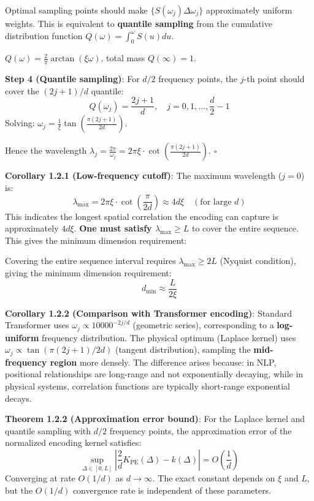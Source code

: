 \documentclass[
  12pt,
]{article}
\begin{document}
Optimal sampling points should make $\{S(\omega_j)\Delta\omega_j\}$ approximately uniform weights. This is equivalent to \textbf{quantile sampling} from the cumulative distribution function $Q(\omega) = \int_0^{\omega} S(u)du$.

$Q(\omega) = \frac{2}{\pi} \arctan(\xi\omega)$, total mass $Q(\infty) = 1$.

\textbf{Step 4 (Quantile sampling)}: For $d/2$ frequency points, the $j$-th point should cover the $(2j+1)/d$ quantile:
\[Q(\omega_j) = \frac{2j+1}{d}, \quad j = 0, 1, \ldots, \frac{d}{2}-1\]
Solving: $\omega_j = \frac{1}{\xi} \tan\left(\frac{\pi(2j+1)}{2d}\right)$.

Hence the wavelength $\lambda_j = \frac{2\pi}{\omega_j} = 2\pi\xi \cdot \cot\left(\frac{\pi(2j+1)}{2d}\right)$. $\square$

\textbf{Corollary 1.2.1 (Low-frequency cutoff)}: The maximum wavelength ($j=0$) is:
\[\lambda_{\max} = 2\pi\xi \cdot \cot\left(\frac{\pi}{2d}\right) \approx 4d\xi \quad (\text{for large } d)\]
This indicates the longest spatial correlation the encoding can capture is approximately $4d\xi$. \textbf{One must satisfy $\lambda_{\max} \geq L$} to cover the entire sequence. This gives the minimum dimension requirement:

Covering the entire sequence interval requires $\lambda_{\max} \geq 2L$ (Nyquist condition), giving the minimum dimension requirement:
\[\boxed{d_{\min} \approx \frac{L}{2\xi}}\]

\textbf{Corollary 1.2.2 (Comparison with Transformer encoding)}: Standard Transformer uses $\omega_j \propto 10000^{-2j/d}$ (geometric series), corresponding to a \textbf{log-uniform} frequency distribution. The physical optimum (Laplace kernel) uses $\omega_j \propto \tan(\pi(2j+1)/2d)$ (tangent distribution), sampling the \textbf{mid-frequency region} more densely. The difference arises because: in NLP, positional relationships are long-range and not exponentially decaying, while in physical systems, correlation functions are typically short-range exponential decays.

\textbf{Theorem 1.2.2 (Approximation error bound)}: For the Laplace kernel and quantile sampling with $d/2$ frequency points, the approximation error of the normalized encoding kernel satisfies:
\[\sup_{\Delta \in [0, L]} \left|\frac{2}{d}K_{\text{PE}}(\Delta) - k(\Delta)\right| = O\left(\frac{1}{d}\right)\]
Converging at rate $O(1/d)$ as $d \to \infty$. The exact constant depends on $\xi$ and $L$, but the $O(1/d)$ convergence rate is independent of these parameters.
\end{document}
